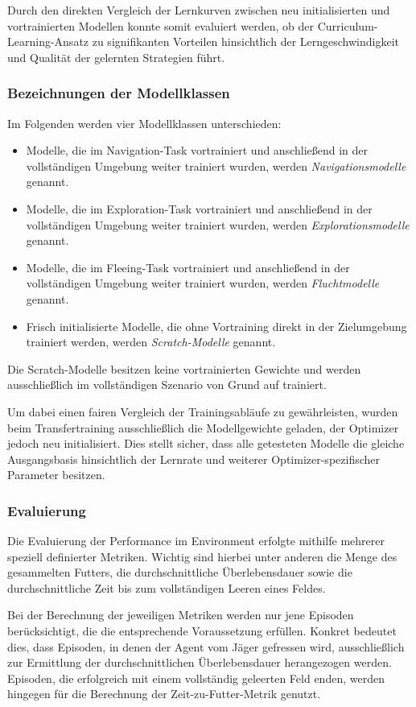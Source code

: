 Durch den direkten Vergleich der Lernkurven zwischen neu initialisierten und vortrainierten Modellen konnte somit evaluiert werden, ob der Curriculum-Learning-Ansatz zu signifikanten Vorteilen hinsichtlich der Lerngeschwindigkeit und Qualität der gelernten Strategien führt.\subsubsection*{Bezeichnungen der Modellklassen}
Im Folgenden werden vier Modellklassen unterschieden:
\begin{itemize}
  \item Modelle, die im Navigation-Task vortrainiert und anschließend in der vollständigen Umgebung weiter trainiert wurden, werden \emph{Navigationsmodelle} genannt.
  \item Modelle, die im Exploration-Task vortrainiert und anschließend in der vollständigen Umgebung weiter trainiert wurden, werden \emph{Explorationsmodelle} genannt.
  \item Modelle, die im Fleeing-Task vortrainiert und anschließend in der vollständigen Umgebung weiter trainiert wurden, werden \emph{Fluchtmodelle} genannt.
  \item Frisch initialisierte Modelle, die ohne Vortraining direkt in der Zielumgebung trainiert werden, werden \emph{Scratch-Modelle} genannt.
\end{itemize}
Die Scratch-Modelle besitzen keine vortrainierten Gewichte und werden ausschließlich im vollständigen Szenario von Grund auf trainiert.  

Um dabei einen fairen Vergleich der Trainingsabläufe zu gewährleisten, wurden beim Transfertraining ausschließlich die Modellgewichte geladen, der Optimizer jedoch neu initialisiert. Dies stellt sicher, dass alle getesteten Modelle die gleiche Ausgangsbasis hinsichtlich der Lernrate und weiterer Optimizer-spezifischer Parameter besitzen.


\subsubsection{Evaluierung}
Die Evaluierung der Performance im Environment erfolgte mithilfe mehrerer speziell definierter Metriken. Wichtig sind hierbei unter anderen die Menge des gesammelten Futters, die durchschnittliche Überlebensdauer sowie die durchschnittliche Zeit bis zum vollständigen Leeren eines Feldes.

Bei der Berechnung der jeweiligen Metriken werden nur jene Episoden berücksichtigt, die die entsprechende Voraussetzung erfüllen. Konkret bedeutet dies, dass Episoden, in denen der Agent vom Jäger gefressen wird, ausschließlich zur Ermittlung der durchschnittlichen Überlebensdauer herangezogen werden. Episoden, die erfolgreich mit einem vollständig geleerten Feld enden, werden hingegen für die Berechnung der Zeit-zu-Futter-Metrik genutzt.
 
